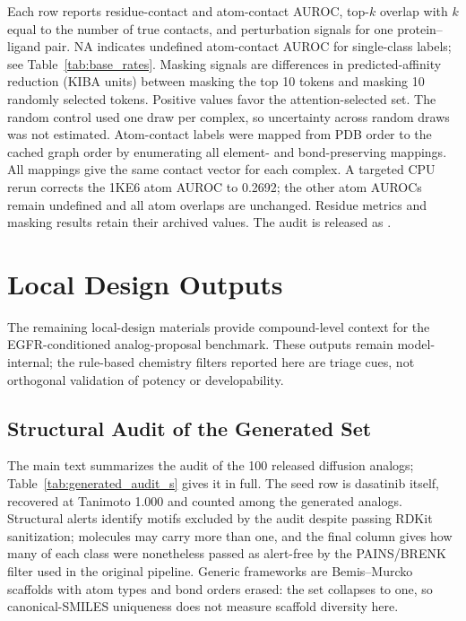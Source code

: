 \documentclass[11pt]{article}
\newenvironment{smalltable}%
{\begin{table}[!htbp]\centering\begingroup\setlength{\tabcolsep}{3pt}\renewcommand{\arraystretch}{1.1}\footnotesize}%
{\endgroup\end{table}}
\begin{document}
\begin{smalltable}
\caption{\textbf{Per-complex structural localization benchmark across 5 kinase co-crystal complexes.}}
\label{tab:interpretability_per_complex}
\par\vspace{3pt}
\begin{minipage}{\linewidth}\footnotesize\raggedright
Each row reports residue-contact and atom-contact AUROC, top-$k$ overlap with $k$ equal to the number of true contacts, and perturbation signals for one protein--ligand pair. NA indicates undefined atom-contact AUROC for single-class labels; see Table~\ref{tab:base_rates}. Masking signals are differences in predicted-affinity reduction (KIBA units) between masking the top 10 tokens and masking 10 randomly selected tokens. Positive values favor the attention-selected set. The random control used one draw per complex, so uncertainty across random draws was not estimated.
Atom-contact labels were mapped from PDB order to the cached graph order by
enumerating all element- and bond-preserving mappings. All mappings give the
same contact vector for each complex. A targeted CPU rerun corrects the 1KE6
atom AUROC to 0.2692; the other atom AUROCs remain undefined and all atom
overlaps are unchanged. Residue metrics and masking results retain their
archived values. The audit is released as
.
\end{minipage}
\end{smalltable}

\section{Local Design Outputs}
The remaining local-design materials provide compound-level context for the EGFR-conditioned analog-proposal benchmark. These outputs remain model-internal; the rule-based chemistry filters reported here are triage cues, not orthogonal validation of potency or developability.

\subsection{Structural Audit of the Generated Set}
The main text summarizes the audit of the 100 released diffusion analogs; Table~\ref{tab:generated_audit_s} gives it in full. The seed row is dasatinib itself, recovered at Tanimoto 1.000 and counted among the generated analogs. Structural alerts identify motifs excluded by the audit despite passing RDKit sanitization; molecules may carry more than one, and the final column gives how many of each class were nonetheless passed as alert-free by the PAINS/BRENK filter used in the original pipeline. Generic frameworks are Bemis--Murcko scaffolds with atom types and bond orders erased: the set collapses to one, so canonical-SMILES uniqueness does not measure scaffold diversity here.
\end{document}
